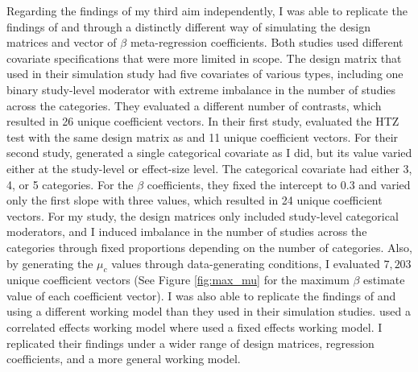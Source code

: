 Regarding the findings of my third aim independently, I was able to replicate the findings of \textcite{joshi_cluster_2022} and \textcite{tipton2015b} through a distinctly different way of simulating the design matrices and vector of $\beta$ meta-regression coefficients. Both studies used different covariate specifications that were more limited in scope. The design matrix that \textcite{tipton2015b} used in their simulation study had five covariates of various types, including one binary study-level moderator with extreme imbalance in the number of studies across the categories. They evaluated a different number of contrasts, which resulted in 26 unique coefficient vectors. In their first study, \textcite{joshi_cluster_2022} evaluated the HTZ test with the same design matrix as \textcite{tipton2015b} and 11 unique coefficient vectors. For their second study, \textcite{joshi_cluster_2022} generated a single categorical covariate as I did, but its value varied either at the study-level or effect-size level. The categorical covariate had either 3, 4, or 5 categories. For the $\beta$ coefficients, they fixed the intercept to 0.3 and varied only the first slope with three values, which resulted in 24 unique coefficient vectors. For my study, the design matrices only included study-level categorical moderators, and I induced imbalance in the number of studies across the categories through fixed proportions depending on the number of categories. Also, by generating the $\mu_c$ values through data-generating conditions, I evaluated $7,203$ unique coefficient vectors (See Figure \ref{fig:max_mu} for the maximum $\beta$ estimate value of each coefficient vector). I was also able to replicate the findings of \textcite{joshi_cluster_2022} and \textcite{tipton2015b} using a different working model than they used in their simulation studies.  \textcite{joshi_cluster_2022} used a correlated effects working model where \textcite{tipton2015b} used a fixed effects working model. I replicated their findings under a wider range of design matrices, regression coefficients, and a more general working model.   

